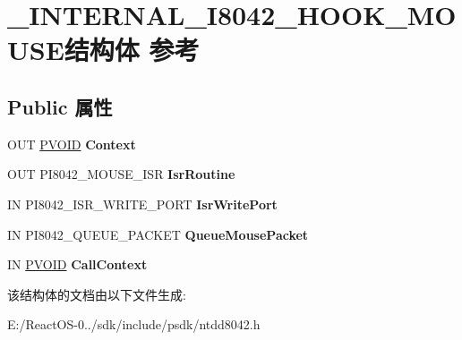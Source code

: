 \hypertarget{struct___i_n_t_e_r_n_a_l___i8042___h_o_o_k___m_o_u_s_e}{}\section{\+\_\+\+I\+N\+T\+E\+R\+N\+A\+L\+\_\+\+I8042\+\_\+\+H\+O\+O\+K\+\_\+\+M\+O\+U\+S\+E结构体 参考}
\label{struct___i_n_t_e_r_n_a_l___i8042___h_o_o_k___m_o_u_s_e}
\subsection*{Public 属性}
\begin{DoxyCompactItemize}
\item 
\mbox{\label{struct___i_n_t_e_r_n_a_l___i8042___h_o_o_k___m_o_u_s_e_a30f4277d28f06c3ffa57a15f9a197366}} 
O\+UT \hyperlink{interfacevoid}{P\+V\+O\+ID} {\bfseries Context}
\item 
\mbox{\label{struct___i_n_t_e_r_n_a_l___i8042___h_o_o_k___m_o_u_s_e_a1b9fb420c637abbcff6b4ee530376bb1}} 
O\+UT P\+I8042\+\_\+\+M\+O\+U\+S\+E\+\_\+\+I\+SR {\bfseries Isr\+Routine}
\item 
\mbox{\label{struct___i_n_t_e_r_n_a_l___i8042___h_o_o_k___m_o_u_s_e_a3d75b558423ed1f3168bee69a565eaad}} 
IN P\+I8042\+\_\+\+I\+S\+R\+\_\+\+W\+R\+I\+T\+E\+\_\+\+P\+O\+RT {\bfseries Isr\+Write\+Port}
\item 
\mbox{\label{struct___i_n_t_e_r_n_a_l___i8042___h_o_o_k___m_o_u_s_e_a2968b8e6cabebfc7f4487325e1127048}} 
IN P\+I8042\+\_\+\+Q\+U\+E\+U\+E\+\_\+\+P\+A\+C\+K\+ET {\bfseries Queue\+Mouse\+Packet}
\item 
\mbox{\label{struct___i_n_t_e_r_n_a_l___i8042___h_o_o_k___m_o_u_s_e_a0452f64c4f7f429ba4cafd90b15ab1e0}} 
IN \hyperlink{interfacevoid}{P\+V\+O\+ID} {\bfseries Call\+Context}
\end{DoxyCompactItemize}


该结构体的文档由以下文件生成\+:\begin{DoxyCompactItemize}
\item 
E\+:/\+React\+O\+S-\/0../sdk/include/psdk/ntdd8042.\+h\end{DoxyCompactItemize}
